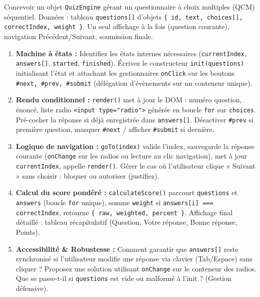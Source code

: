 \documentclass[11pt]{article}
\begin{document}
\begin{exercice}
Concevoir un objet \texttt{QuizEngine} gérant un questionnaire à choix multiples (QCM) séquentiel. Données : tableau \texttt{questions[]} d'objets \texttt{\{ id, text, choices[], correctIndex, weight \}}. Un seul affichage à la fois (question courante), navigation Précédent/Suivant, soumission finale.
\begin{enumerate}
    \item \textbf{Machine à états :} Identifiez les états internes nécessaires (\texttt{currentIndex}, \texttt{answers[]}, \texttt{started}, \texttt{finished}). Écrivez le constructeur \texttt{init(questions)} initialisant l'état et attachant les gestionnaires \texttt{onClick} sur les boutons \texttt{\#next, \#prev, \#submit} (délégation d'évènements sur un conteneur unique).
    \item \textbf{Rendu conditionnel :} \texttt{render()} met à jour le DOM : numéro question, énoncé, liste radio \texttt{<input type="radio">} générée en boucle \texttt{for} sur \texttt{choices}. Pré-cocher la réponse si déjà enregistrée dans \texttt{answers[]}. Désactiver \texttt{\#prev} si première question, masquer \texttt{\#next} / afficher \texttt{\#submit} si dernière.
    \item \textbf{Logique de navigation :} \texttt{goTo(index)} valide l'index, sauvegarde la réponse courante (\texttt{onChange} sur les radios ou lecture au clic navigation), met à jour \texttt{currentIndex}, appelle \texttt{render()}. Gérer le cas où l'utilisateur clique « Suivant » sans choisir : bloquer ou autoriser (justifiez).
    \item \textbf{Calcul du score pondéré :} \texttt{calculateScore()} parcourt \texttt{questions} et \texttt{answers} (boucle \texttt{for} unique), somme \texttt{weight} si \texttt{answers[i] === correctIndex}, retourne \texttt{\{ raw, weighted, percent \}}. Affichage final détaillé : tableau récapitulatif (Question, Votre réponse, Bonne réponse, Points).
    \item \textbf{Accessibilité \& Robustesse :} Comment garantir que \texttt{answers[]} reste synchronisé si l'utilisateur modifie une réponse via clavier (Tab/Espace) sans cliquer ? Proposez une solution utilisant \texttt{onChange} sur le conteneur des radios. Que se passe-t-il si \texttt{questions} est vide ou malformé à l'init ? (Gestion défensive).
\end{enumerate}
\end{exercice}
\end{document}
